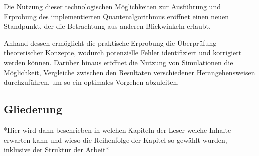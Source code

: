 Die Nutzung dieser technologischen Möglichkeiten zur Ausführung und Erprobung des implementierten Quantenalgorithmus eröffnet einen neuen Standpunkt, 
der die Betrachtung aus anderen Blickwinkeln erlaubt. 

Anhand dessen ermöglicht die praktische Erprobung die Überprüfung theoretischer Konzepte,
wodurch potenzielle Fehler identifiziert und korrigiert werden können.
Darüber hinaus eröffnet die Nutzung von Simulationen die Möglichkeit,
Vergleiche zwischen den Resultaten verschiedener Herangehensweisen durchzuführen, 
um so ein optimales Vorgehen abzuleiten.

\subsection{Gliederung}
*Hier wird dann beschrieben in welchen Kapiteln der Leser welche Inhalte erwarten kann und wieso die Reihenfolge der Kapitel so gewählt wurden, inklusive der Struktur der Arbeit*

